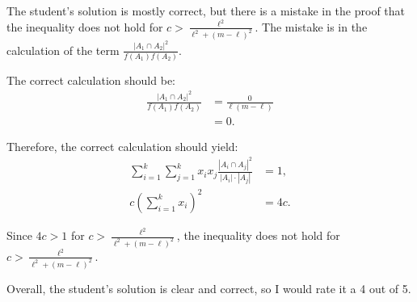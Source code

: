 The student's solution is mostly correct, but there is a mistake in the proof that the inequality does not hold for $c > \frac{\ell^2}{\ell^2 + (m-\ell)^2}$. The mistake is in the calculation of the term $\frac{|A_1\cap A_2|^2}{f(A_1)f(A_2)}$. 

The correct calculation should be:
\begin{align*}
\frac{|A_1\cap A_2|^2}{f(A_1)f(A_2)} &= \frac{0}{\ell(m-\ell)} \\
&= 0.
\end{align*}

Therefore, the correct calculation should yield:
\begin{align*}
\sum_{i=1}^k\sum_{j=1}^k x_ix_j \frac{|A_i\cap A_j|^2}{|A_i|\cdot|A_j|} &= 1, \\
c\left(\sum_{i=1}^k x_i\right)^2 &= 4c.
\end{align*}

Since $4c > 1$ for $c > \frac{\ell^2}{\ell^2 + (m-\ell)^2}$, the inequality does not hold for $c > \frac{\ell^2}{\ell^2 + (m-\ell)^2}$.

Overall, the student's solution is clear and correct, so I would rate it a 4 out of 5.
